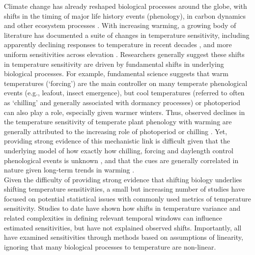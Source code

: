 \documentclass[11pt,letter]{article}
\begin{document}
Climate change has already reshaped biological processes around the globe, with shifts in the timing of major life history events (phenology), in carbon dynamics and other ecosystem processes \citep{IPCC:2014sm}. With increasing warming,  a growing body of literature has documented a suite of changes in temperature sensitivity, including apparently declining responses to temperature in recent decades \citep{fu2015,gusewell2017,piao2017,dai2019ag}, and more uniform sensitivities across elevation \citep{vitasse2018}. Researchers generally suggest these shifts in temperature sensitivity are driven by fundamental shifts in underlying biological processes. For example, fundamental science suggests that warm temperatures (`forcing') are the main controller on many temperate phenological events (e.g., leafout, insect emergence), but cool temperatures (referred to often as `chilling' and generally associated with dormancy processes) or photoperiod can also play a role, especially given warmer winters. Thus, observed declines in the temperature sensitivity of temperate plant phenology with warming are generally attributed to the increasing role of photoperiod or chilling  \citep[e.g.,][]{fu2015,gauzere2019}. Yet, providing strong evidence of this mechanistic link is difficult given that the underlying model of how exactly how chilling, forcing and daylength control phenological events is unknown \citep{chuine2016}, and that the cues are generally correlated in nature given long-term trends in warming \citep[e.g.,][]{fu2015}. \\


Given the difficulty of providing strong evidence that shifting biology underlies shifting temperature sensitivities, a small but increasing number of studies have focused on potential statistical issues with commonly used metrics of temperature sensitivity. Studies to date have shown how shifts in temperature variance and related complexities in defining relevant temporal windows \citep{clark2014a,gusewell2017,keenan2019} can influence estimated sensitivities, but have not explained observed shifts. Importantly, all have examined sensitivities through methods based on assumptions of linearity, ignoring that many biological processes to temperature are non-linear. \\
\end{document}
